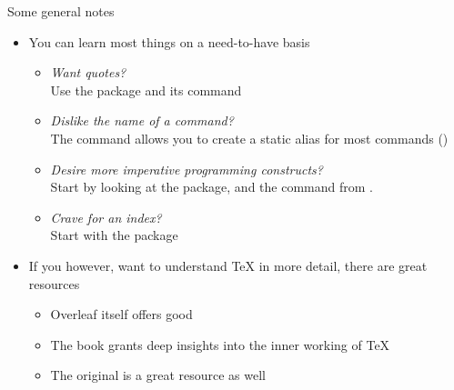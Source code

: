 \begin{frame}{Some general notes}
   \begin{itemize}
      \itemsep8pt
      \item You can learn most things on a need-to-have basis
         \begin{itemize}
            \item \textit{Want quotes?}\\
                  Use the \CsquotesPkg package and its \blatex{\\enquote} command
            \item \textit{Dislike the name of a command?}\\
                  The \blatex{\\let} command allows you to create a static alias for most commands ()
            \item \textit{Desire more imperative programming constructs?}\\
                  Start by looking at the \EtoolboxPkg package, and the \blatex{\\foreach} command from \TikzPkg.
            \item \textit{Crave for an index?}\\
                  Start with the \ImakeidxPkg package
         \end{itemize}
      \item If you however, want to understand \TeX{} in more detail, there are great resources \begin{itemize}
         \item Overleaf itself offers good 
         \item The  book grants deep insights into the inner working of \TeX{}
         \item The original  is a great resource as well
      \end{itemize}
   \end{itemize}
\end{frame}

